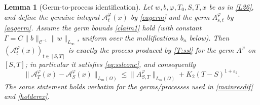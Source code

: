 \documentclass[12pt]{article}
\newtheorem{lemma}[theorem]{Lemma}
\theoremstyle{definition}
\DeclareMathOperator{\1}{\mathbbm{1}}%
\def\phi{\varphi}
\renewcommand{\le}{\leqslant}
\newcommand{\A}{\mathcal{A}}
\newcommand{\C}{\mathcal{C}}
\begin{document}
\begin{lemma}[Germ-to-process identification]\label{L:ident}
Let $w,b,\phi,T_0,S,T,x$ be as in \cref{L26}, and define the genuine integral
$\A^\phi_t(x)$ by \eqref{cagerm} and the germ $A^\phi_{s,t}$ by \eqref{aagerm}. Assume
the germ bounds \eqref{claim1} hold (with constant $\Gamma=C\|b\|_{\C^{-1}}\|w\|_{L_\infty}$,
uniform over the mollifications $b_n$ below). Then $(\A^\phi_t(x))_{t\in[S,T]}$ is exactly
the process produced by \cref{T:ssl} for the germ $A^\phi$ on $[S,T]$; in particular it
satisfies \eqref{eq:sslconc}, and consequently
\begin{equation}\label{eq:identbound}
\|\A^\phi_T(x)-\A^\phi_S(x)\|_{L_m(\Omega)}\le \|A^\phi_{S,T}\|_{L_m(\Omega)}+K_2(T-S)^{1+\varepsilon_2}.
\end{equation}
The same statement holds verbatim for the germs/processes used in \eqref{mainresdif}
and \eqref{holderex}.
\end{lemma}
\end{document}
